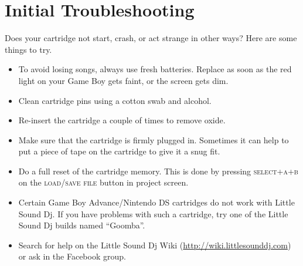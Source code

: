 \section{Initial Troubleshooting}

Does your cartridge not start, crash, or act strange in other ways? Here are some things to try.

\begin{itemize}
	\item To avoid losing songs, always use fresh batteries. Replace as soon as the red light on your Game Boy gets faint, or the screen gets dim.
	\item Clean cartridge pins using a cotton swab and alcohol.
	\item Re-insert the cartridge a couple of times to remove oxide.
	\item Make sure that the cartridge is firmly plugged in. Sometimes it can help to put a piece of tape on the cartridge to give it a snug fit.
	\item Do a full reset of the cartridge memory. This is done by pressing \textsc{select+a+b} on the \textsc{load/save file} button in project screen.
	\item Certain Game Boy Advance/Nintendo DS cartridges do not work with Little Sound Dj. If you have problems with such a cartridge, try one of the Little Sound Dj builds named ``Goomba''.
	\item Search for help on the Little Sound Dj Wiki (\url{http://wiki.littlesounddj.com}) or ask in the Facebook group.
\end{itemize}
